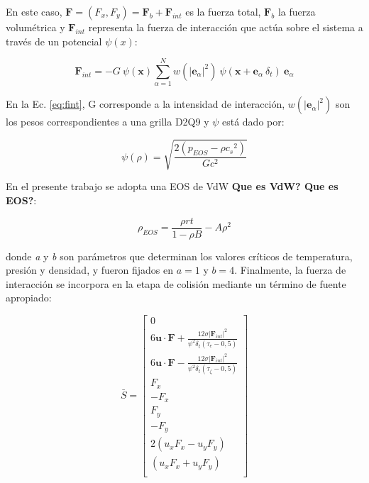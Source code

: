 En este caso, $ {\mathbf{F}} = (F_{x} , F_{y} ) = {\mathbf{F}}_{b} + {\mathbf{F}}_{int} $ es la fuerza total, ${\mathbf{F}}_{b}$ la fuerza volumétrica y ${\mathbf{F}}_{int}$ representa la fuerza de interacción que actúa sobre el sistema a través de un potencial $\psi(x)$:
    
\begin{equation}
    {\mathbf{F}}_{int} = - G \> \psi(\mathbf{x}) \sum_{\alpha=1}^{N} w({|{\mathbf{e}}_{\alpha}|}^{2}) \> \psi (\mathbf{x} + {\mathbf{e}}_{\alpha} \> \delta_{t}) \> {\mathbf{e}}_{\alpha} 
    \label{eq:fint}
\end{equation}

En la Ec. \ref{eq:fint}, G corresponde a la intensidad de interacción, $w({|{\mathbf{e}}_{\alpha}|}^{2})$ son los pesos correspondientes a una grilla D2Q9 y $\psi$ está dado por:

\begin{equation} 
    \psi(\rho) = \sqrt{\frac{2 (p_{EOS} - \rho {c_{s}}^{2})}{G {c}^{2}}}
\end{equation}

En el presente trabajo se adopta una EOS de VdW \textbf{Que es VdW? Que es EOS?}:

\begin{equation}
    \rho_{EOS} = \frac{\rho r t}{1- \rho B} - A {\rho}^{2}
\end{equation}

donde \textit{a} y \textit{b} son parámetros que determinan los valores críticos de temperatura, presión y densidad, y fueron fijados en $\textit{a} = 1$ y $\textit{b} = 4$. Finalmente, la fuerza de interacción se incorpora en la etapa de colisión mediante un término de fuente apropiado:

\begin{equation}
    \bar{S} = 
    \left[ \begin{array}{c} 
        0\\
        6 \mathbf{u}\cdot \mathbf{F} + \frac{12 \sigma {|{\mathbf{F}_{int}|}}^{2} }{{\psi}^{2} \delta_{t} (\tau_{e} - 0,5)}\\
        6 \mathbf{u}\cdot \mathbf{F} - \frac{12 \sigma {|{\mathbf{F}_{int}|}}^{2} }{{\psi}^{2} \delta_{t} (\tau_{\zeta } - 0,5)}\\
        F_{x}\\
        -F_{x}\\
        F_{y}\\
        -F_{y}\\
        2(u_{x} F_{x} - u_{y} F_{y} )\\
        (u_{x} F_{x} + u_{y} F_{y} )\\              
    \end{array}
    \right]    
\end{equation}

